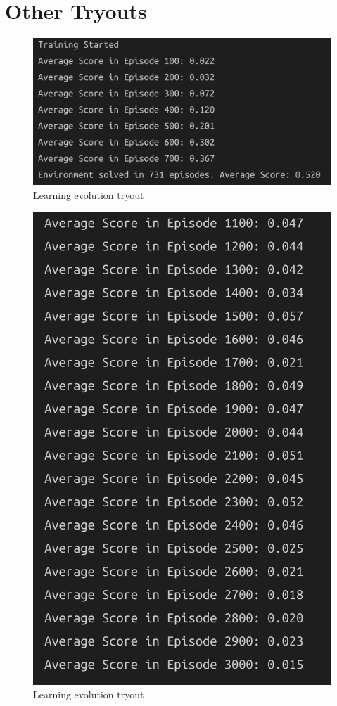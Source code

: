 \documentclass[
]{article}
\begin{document}
\pagebreak

\hypertarget{other-tryouts}{%
\section{Other Tryouts}\label{other-tryouts}}

\begin{figure}
\centering
\includegraphics{imgs/results_3.png}
\caption{Learning evolution tryout}
\end{figure}

\pagebreak

\begin{figure}
\centering
\includegraphics{imgs/results_4.png}
\caption{Learning evolution tryout}
\end{figure}
\end{document}
